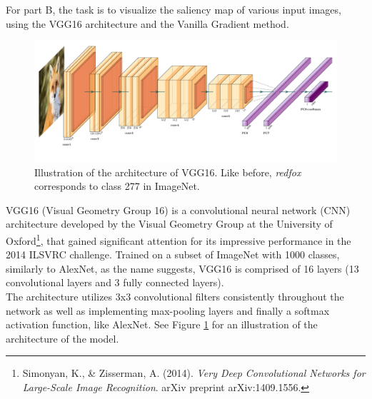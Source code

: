 \documentclass{article}
\begin{document}
    For part B, the task is to visualize the saliency map of various input images, using the VGG16 architecture and the Vanilla Gradient method. \\
    
     
    \begin{figure}[h]
    	\includegraphics[width=1.0\textwidth]{images/vgg16.pdf}
    	\caption{Illustration of the architecture of VGG16. Like before, \textit{redfox} corresponds to class 277 in ImageNet.}
    	\label{fig:VGG16}
    \end{figure}

    VGG16 (Visual Geometry Group 16) is a convolutional neural network (CNN) architecture developed by the Visual Geometry Group at the University of Oxford\footnote{Simonyan, K., \& Zisserman, A. (2014). \textit{Very Deep Convolutional Networks for Large-Scale Image Recognition}. arXiv preprint arXiv:1409.1556.}, that gained significant attention for its impressive performance in the 2014 ILSVRC challenge. Trained on a subset of ImageNet with 1000 classes, similarly to AlexNet, as the name suggests, VGG16 is comprised of 16 layers (13 convolutional layers and 3 fully connected layers). \\
    
    The architecture utilizes 3x3 convolutional filters consistently throughout the network as well as implementing max-pooling layers and finally a softmax activation function, like AlexNet. See Figure \ref{fig:VGG16} for an illustration of the architecture of the model. \\
    
\end{document}
